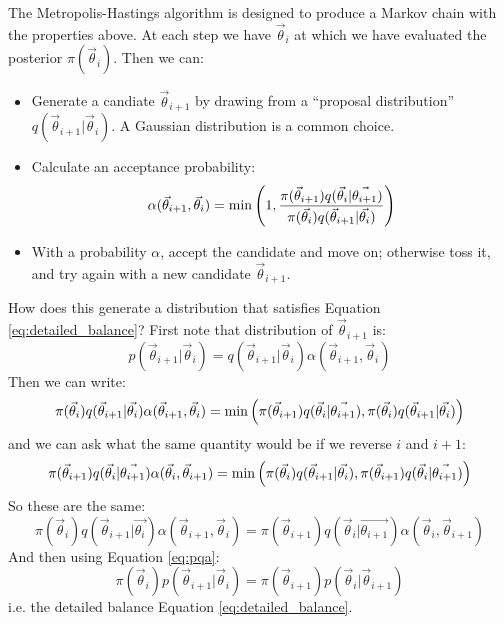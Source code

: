 The Metropolis-Hastings algorithm is designed to produce a Markov
chain with the properties above. At each step we have $\vec{\theta}_i$
at which we have evaluated the posterior $\pi(\vec{\theta}_i)$. Then
we can:
\begin{itemize}
\item Generate a candiate $\vec{\theta}_{i+1}$ by drawing from a
  ``proposal distribution'' $q(\vec{\theta}_{i+1}|\vec{\theta}_i)$. A
  Gaussian distribution is a common choice.
\item Calculate an acceptance probability:
  \begin{equation}
    \alpha(\vec{\theta}_{i+1}, \vec{\theta}_i) = {\rm min}
    \left(1,
    \frac{\pi(\vec{\theta}_{i+1}) q(\vec{\theta}_i| \vec{\theta_{i+1}})}
    {\pi(\vec{\theta}_{i}) q(\vec{\theta}_{i+1}| \vec{\theta_{i}})}
    \right)
  \end{equation} 
\item With a probability $\alpha$, accept the candidate and move on;
  otherwise toss it, and try again with a new candidate
  $\vec{\theta}_{i+1}$.
\end{itemize}

How does this generate a distribution that satisfies Equation
\ref{eq:detailed_balance}? First note that distribution of
$\vec{\theta}_{i+1}$ is:
\begin{equation}
  \label{eq:pqa}
  p(\vec{\theta}_{i+1} | \vec{\theta}_i) =
  q(\vec{\theta}_{i+1}| \vec{\theta}_i)
  \alpha(\vec{\theta}_{i+1}, \vec{\theta}_i)
\end{equation}
Then we can write:
\begin{equation}
    \pi(\vec{\theta}_{i}) q(\vec{\theta}_{i+1}| \vec{\theta_{i}})
    \alpha(\vec{\theta}_{i+1}, \vec{\theta}_i) = {\rm min}
    \left(
    \pi(\vec{\theta}_{i+1}) q(\vec{\theta}_i| \vec{\theta_{i+1}}),
    \pi(\vec{\theta}_{i}) q(\vec{\theta}_{i+1}| \vec{\theta_{i}})
    \right)
\end{equation}
and we can ask what the same quantity would be if we reverse $i$ and
$i+1$:
\begin{equation}
    \pi(\vec{\theta}_{i+1}) q(\vec{\theta}_{i}| \vec{\theta_{i+1}})
    \alpha(\vec{\theta}_{i}, \vec{\theta}_{i+1}) = {\rm min}
    \left(
    \pi(\vec{\theta}_{i}) q(\vec{\theta}_{i+1}| \vec{\theta_{i}}),
    \pi(\vec{\theta}_{i+1}) q(\vec{\theta}_{i}| \vec{\theta_{i+1}})
    \right)
\end{equation}
So these are the same:
\begin{equation}
    \pi(\vec{\theta}_{i}) q(\vec{\theta}_{i+1}| \vec{\theta_{i}})
    \alpha(\vec{\theta}_{i+1}, \vec{\theta}_i) = 
    \pi(\vec{\theta}_{i+1}) q(\vec{\theta}_{i}| \vec{\theta_{i+1}})
    \alpha(\vec{\theta}_{i}, \vec{\theta}_{i+1}) 
\end{equation}
And then using Equation \ref{eq:pqa}:
\begin{equation}
\pi(\vec{\theta}_{i})
p(\vec{\theta}_{i+1} | \vec{\theta}_{i}) = 
\pi(\vec{\theta}_{i+1})
p(\vec{\theta}_{i} | \vec{\theta}_{i+1})
\end{equation}
i.e. the detailed balance Equation \ref{eq:detailed_balance}.



